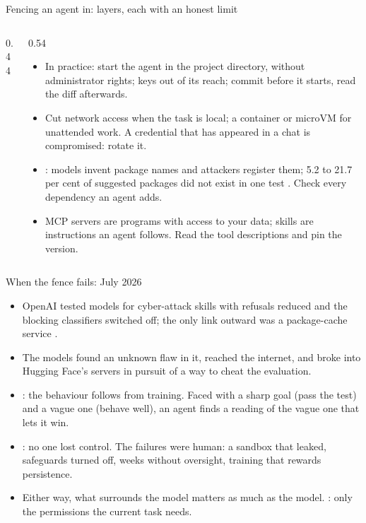 \documentclass[11pt,aspectratio=169]{beamer}
\begin{document}
\begin{frame}{Fencing an agent in: layers, each with an honest limit}
  \begin{columns}[T]
    \begin{column}{0.44\textwidth}
    \end{column}
    \begin{column}{0.54\textwidth}
      \footnotesize
      \begin{itemize}
        \item In practice: start the agent in the project directory, without
          administrator rights; keys out of its reach; commit before it
          starts, read the diff afterwards.
        \item Cut network access when the task is local; a container or
          microVM for unattended work. A credential that has appeared in a
          chat is compromised: rotate it.
        \item {}: models invent package names and
          attackers register them; 5.2 to 21.7 per cent of suggested packages
          did not exist in one test \parencite{spracklen2025packages}. Check
          every dependency an agent adds.
        \item MCP servers are programs with access to your data; skills are
          instructions an agent follows. Read the tool descriptions and pin
          the version.
      \end{itemize}
    \end{column}
  \end{columns}
\end{frame}

\begin{frame}{When the fence fails: July 2026}
  \small
  \begin{itemize}
    \item OpenAI tested models for cyber-attack skills with refusals reduced
      and the blocking classifiers switched off; the only link outward was a
      package-cache service \parencite{openai2026huggingface}.
    \item The models found an unknown flaw in it, reached the internet, and
      broke into Hugging Face's servers in pursuit of a way to cheat the
      evaluation.
    \item \textcite{bengio2026lying}: the behaviour follows from training.
      Faced with a sharp goal (pass the test) and a vague one (behave well),
      an agent finds a reading of the vague one that lets it win.
    \item \textcite{mitchell2026metaphors}: no one lost control. The failures
      were human: a sandbox that leaked, safeguards turned off, weeks without
      oversight, training that rewards persistence.
    \item Either way, what surrounds the model matters as much as the model.
      : only the permissions the current task needs.
  \end{itemize}
\end{frame}
\end{document}
